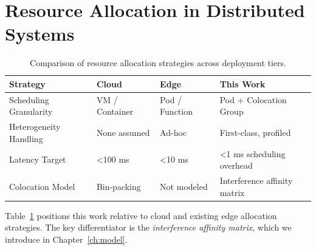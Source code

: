 \section{Resource Allocation in Distributed Systems}

\begin{table}[htbp]
\centering
\caption{Comparison of resource allocation strategies across deployment tiers.}
\label{tab:comparison}
\begin{tabularx}{\textwidth}{l>{\raggedright\arraybackslash}X>{\raggedright\arraybackslash}X>{\raggedright\arraybackslash}X}
\toprule
\textbf{Strategy} & \textbf{Cloud} & \textbf{Edge} & \textbf{This Work} \\
\midrule
Scheduling Granularity & VM / Container & Pod / Function & Pod + Colocation Group \\
Heterogeneity Handling & None assumed & Ad-hoc & First-class, profiled \\
Latency Target & \textless 100 ms & \textless 10 ms & \textless 1 ms scheduling overhead \\
Colocation Model & Bin-packing & Not modeled & Interference affinity matrix \\
\bottomrule
\end{tabularx}
\end{table}

Table~\ref{tab:comparison} positions this work relative to cloud and existing edge allocation strategies. The key differentiator is the \textit{interference affinity matrix}, which we introduce in Chapter~\ref{ch:model}.
